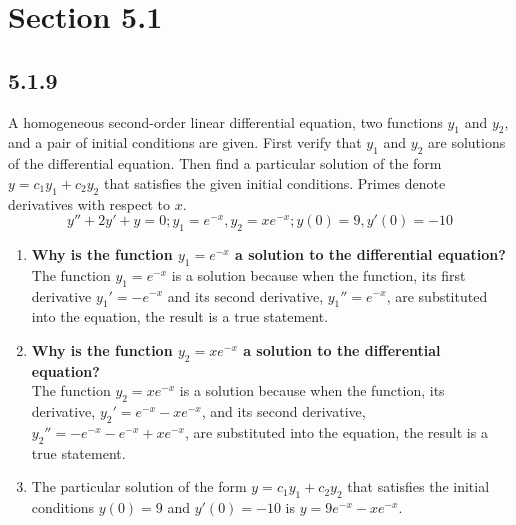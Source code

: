 \documentclass{article}
\begin{document}
\newcommand{\hr}{\par\noindent\rule{\textwidth}{0.4pt}}

\newcommand{\bc}[1]{
	\begin{equation*}
		\begin{boxed}
			{#1}
		\end{boxed}
	\end{equation*}
}

\newcommand{\cond}[2]{
	\ifmmode
		{#1} \quad {#2}
	\else
		$$ {#1} \quad {#2} $$
	\fi
}

\tableofcontents

\section{Section 5.1}

\subsection{5.1.9}
A homogeneous second-order linear differential equation, two functions $ y_1 $ and $ y_2 $, and a pair of initial conditions are given. First verify that $ y_1 $ and $ y_2 $ are solutions of the differential equation. Then find a particular solution of the form $ y = c_1y_1 + c_2y_2 $ that satisfies the given initial conditions. Primes denote derivatives with respect to $ x $.
$$ y'' + 2y' + y = 0; y_1 = e^{-x}, y_2 = xe^{-x}; y(0) = 9, y'(0) = -10 $$
\begin{enumerate}[label=\textbf{(\alph*)}]
	\item \textbf{Why is the function $ y_1 = e^{-x} $ a solution to the differential equation?} \\
		The function $ y_1 = e^{-x} $ is a solution because when the function, its first derivative $ y_1' = -e^{-x} $ and its second derivative, $ y_1'' = e^{-x} $, are substituted into the equation, the result is a true statement.
	\item \textbf{Why is the function $ y_2 = xe^{-x} $ a solution to the differential equation?} \\
		The function $ y_2 = xe^{-x} $ is a solution because when the function, its derivative, $ y_2' = e^{-x} - xe^{-x} $, and its second derivative, $ y_2'' = -e^{-x} - e^{-x} + xe^{-x} $, are substituted into the equation, the result is a true statement.
	\item The particular solution of the form $ y = c_1y_1 + c_2y_2 $ that satisfies the initial conditions $ y(0) = 9 $ and $ y'(0) = -10 $ is $ y = 9e^{-x} - xe^{-x} $.
\end{enumerate}
\end{document}

